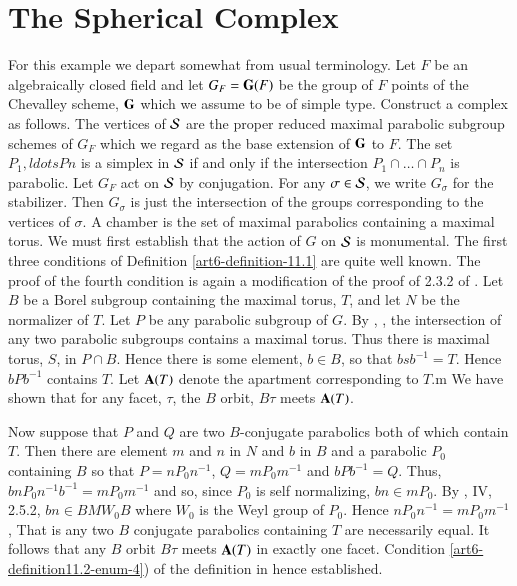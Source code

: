 \section*{The Spherical Complex}
 For this example we depart somewhat from usual  terminology. Let $F$ be an algebraically closed field and let $G_{F} = \mathbf{G}(F)$ be the group of $F$ points of the Chevalley scheme, $\mathbf{G}$ which we assume to be of simple type. Construct a complex as follows. The vertices of $\mathcal{S}$ are the proper reduced maximal parabolic subgroup schemes of $G_{F}$ which we regard as the base extension of $\mathbf{G}$ to $F$. The set $P_{1},ldots P{n}$ is a simplex in $\mathcal{S}$ if and only if the intersection  $P_{1}\cap \ldots \cap P_{n}$ is parabolic. Let $G_{F}$ act on $\mathcal{S}$ by conjugation. For any $\sigma \in \mathcal{S}$, we write $G_{\sigma}$ for the stabilizer. Then $G_{\sigma}$ is just the intersection of the groups corresponding to the vertices of $\sigma$. A chamber is the set of maximal parabolics containing a maximal torus. We must first establish that the action of $G$ on $\mathcal{S}$ is monumental. The first three conditions of Definition
 \ref{art6-definition-11.1} are quite well  known. The proof of the fourth condition is again a modification of the proof of 2.3.2 of \cite{BT I}. Let $B$ be a Borel subgroup containing the maximal torus, $T$, and let $N$ be the normalizer of $T$. Let $P$ be any parabolic subgroup of $G$. By \cite{art6-keyH}, \cite{art6-definition-6.1}, the intersection of any two parabolic subgroups contains a maximal torus. Thus there is maximal torus, $S$, in $P \cap B$. Hence there is some element, $b \in B$, so that $bsb^{-1} = T$. Hence $bPb^{-1}$ contains $T$. Let $\mathbf{A}(T)$ denote the apartment corresponding to $T$.m We have shown that for any facet, $\tau$, the $B$ orbit, $B\tau$  meets $\mathbf{A}(T)$.  

Now suppose that $P$ and $Q$ are two $B$-conjugate parabolics both of which contain $T$. Then there are element $m$ and $n$ in $N$ and $b$ in $B$ and a parabolic $P_{0}$ containing $B$ so that $P=nP_{0}n^{-1}$, $Q=m P_{0}m^{-1}$ and $bPb^{-1}=Q$. Thus, $bnP_{0}n^{-1}b^{-1} = mP_{0}m^{-1}$ and so, since $P_{0}$ is self normalizing, $bn \in m P_{0}$. By \cite{art6-keyBo}, IV, 2.5.2, $bn \in BMW_{0} B$ where $W_{0}$ is the Weyl group of $P_{0}$. Hence $nP_{0}n^{-1} = mP_{0}m^{-1}$, That is any two $B$ conjugate parabolics containing $T$ are necessarily equal. It follows that any $B$ orbit $B\tau$ meets $\mathbf{A}(T)$ in exactly one facet. Condition \ref{art6-definition11.2-enum-4}) of the definition in hence established.

